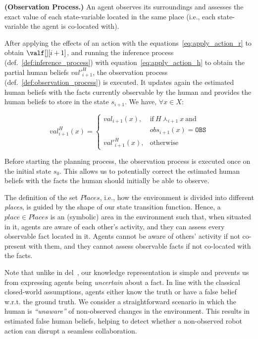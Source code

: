 {\begin{definition} \label{def:observation_process}
    \textbf{(Observation Process.)} An agent observes its surroundings and assesses the exact value of each state-variable located in the same place (i.e., each state-variable the agent is co-located with).
\end{definition}

After applying the effects of an action with the equations~\ref{eq:apply_action_r} to obtain $\valf[][i+1]$, and running the inference process (def.~\ref{def:inference_process}) with equation~\ref{eq:apply_action_h} to obtain the partial human beliefs $val'^H_{i+1}$, the observation process (def.~\ref{def:observation_process}) is executed. It updates again the estimated human beliefs with the facts currently observable by the human and provides the human beliefs to store in the state $s_{i+1}$. We have, $\forall x \in X$:

\begin{equation}
val^H_{i+1}(x) = \left\{ 
\begin{array}{ll}
val_{i+1}(x), & \mbox{if}~ H \curlywedge_{i+1} x ~\mbox{and}~ \\
    & obs_{i+1}(x) = \texttt{OBS}\\
val'^H_{i+1}(x), & \mbox{otherwise}
\end{array}\right.
\end{equation}

Before starting the planning process, the observation process is executed once on the initial state $s_0$. This allows us to potentially correct the estimated human beliefs with the facts the human should initially be able to observe. 

The definition of the set $Places$, i.e., how the environment is divided into different \textit{places}, is guided by the shape of our state transition function. Hence, a $place \in Places$ is an (symbolic) area in the environment such that, when situated in it, agents are aware of each other's activity, and they can assess every observable fact located in it. Agents cannot be aware of others' activity if not co-present with them, and they cannot assess observable facts if not co-located with the facts.

Note that unlike in \acrshort{del}~\cite{KR2021-12}, our knowledge representation is simple and prevents us from expressing agents being \textit{uncertain} about a fact. 
In line with the classical closed-world assumptions, agents either know the truth or have a false belief w.r.t. the ground truth. 
We consider a straightforward scenario in which the human is \textit{``unaware''} of non-observed changes in the environment. 
This results in estimated false human beliefs, helping to detect whether a non-observed robot action can disrupt a seamless collaboration. 

}
